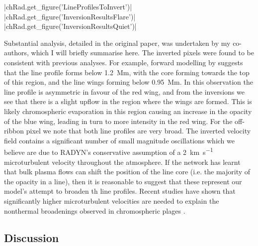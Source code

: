 \py[Radynversion]|chRad.get_figure('LineProfilesToInvert')|
\py[Radynversion]|chRad.get_figure('InversionResultsFlare')|
\py[Radynversion]|chRad.get_figure('InversionResultsQuiet')|

Substantial analysis, detailed in the original paper, was undertaken by my co-authors, which I will briefly summarise here.
The inverted pixels were found to be consistent with previous analyses.
For example, forward modelling by \citet{Kuridze2015} suggests that the \Ha{} line profile forms below \SI{1.2}{\mega\metre}, with the core forming towards the top of this region, and the line wings forming below \SI{0.95}{\mega\metre}.
In this observation the \Ha{} line profile is asymmetric in favour of the red wing, and from the inversions we see that there is a slight upflow in the region where the wings are formed.
This is likely chromospheric evaporation in this region causing an increase in the opacity of the blue wing, leading in turn to more intensity in the red wing.
For the off-ribbon pixel we note that both line profiles are very broad.
The inverted velocity field contains a significant number of small magnitude oscillations which we believe are due to RADYN's conservative assumption of a \SI{2}{\kilo\metre\per\second} microturbulent velocity throughout the atmosphere.
If the network has learnt that bulk plasma flows can shift the position of the line core (i.e. the majority of the opacity in a line), then it is reasonable to suggest that these represent our model's attempt to broaden th line profiles.
Recent studies have shown that significantly higher microturbulent velocities are needed to explain the nonthermal broadenings observed in chromospheric plages \citep[\SIrange{6}{7}{\kilo\metre\per\second};][]{2015Carlsson}.

\subsection{Discussion}

